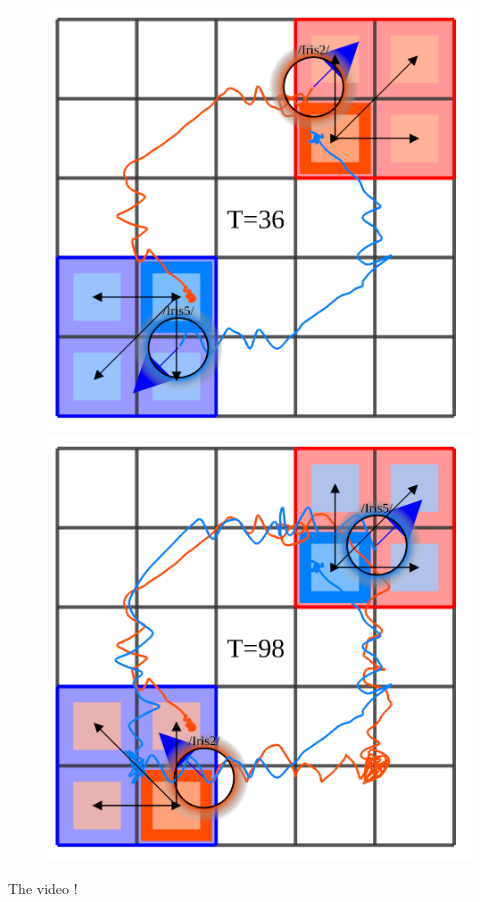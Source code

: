 \documentclass{beamer}
\begin{document}
\begin{frame}
\begin{figure}
  \begin{minipage}{0.3\textwidth}
    \centering
    \includegraphics[width=\linewidth]{multi_ltl/multi11}
  \end{minipage} 
  \begin{minipage}{0.3\textwidth}
    \centering
    \includegraphics[width=\linewidth]{multi_ltl/multi12}
  \end{minipage} 
\end{figure}

\pause
The video !
\end{frame}
\end{document}
